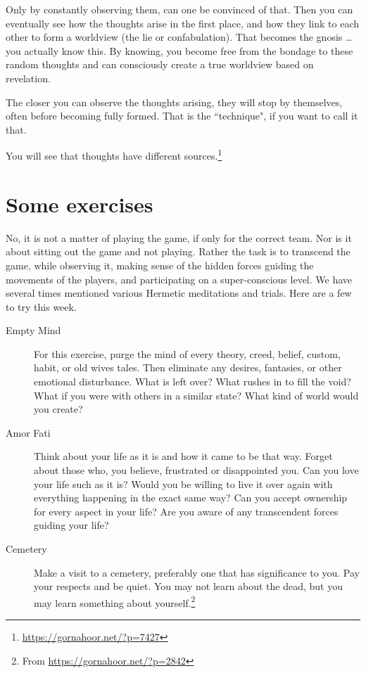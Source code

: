 Only by constantly observing them, can one be convinced of that. Then you can eventually see how the thoughts arise in the first place, and how they link to each other to form a worldview (the lie or confabulation). That becomes the gnosis … you actually know this. By knowing, you become free from the bondage to these random thoughts and can consciously create a true worldview based on revelation.

The closer you can observe the thoughts arising, they will stop by themselves, often before becoming fully formed. That is the ``technique", if you want to call it that.

You will see that thoughts have different sources.\footnote{\url{https://gornahoor.net/?p=7427}}

\section{Some exercises}

No, it is not a matter of playing the game, if only for the correct team. Nor is it about sitting out the game and not playing. Rather the task is to transcend the game, while observing it, making sense of the hidden forces guiding the movements of the players, and participating on a super-conscious level. We have several times mentioned various Hermetic meditations and trials. Here are a few to try this week.


\begin{description}

\item[Empty Mind]

For this exercise, purge the mind of every theory, creed, belief, custom, habit, or old wives tales. Then eliminate any desires, fantasies, or other emotional disturbance. What is left over? What rushes in to fill the void? What if you were with others in a similar state? What kind of world would you create?
\item[Amor Fati]

Think about your life as it is and how it came to be that way. Forget about those who, you believe, frustrated or disappointed you. Can you love your life such as it is? Would you be willing to live it over again with everything happening in the exact same way? Can you accept ownership for every aspect in your life? Are you aware of any transcendent forces guiding your life?
\item[Cemetery]

Make a visit to a cemetery, preferably one that has significance to you. Pay your respects and be quiet. You may not learn about the dead, but you may learn something about yourself.\footnote{From \url{https://gornahoor.net/?p=2842}}
\end{description}
